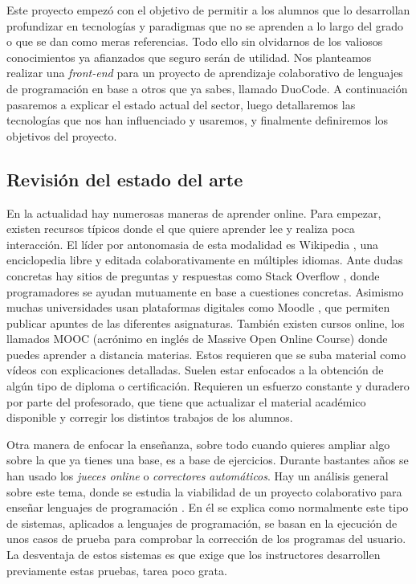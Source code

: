 
Este proyecto empezó con el objetivo de permitir a los alumnos que lo desarrollan profundizar en tecnologías y paradigmas que no se aprenden a lo largo del grado o que se dan como meras referencias. Todo ello sin olvidarnos de los valiosos conocimientos ya afianzados que seguro serán de utilidad. Nos planteamos realizar una \emph{front-end} para un proyecto de aprendizaje colaborativo de lenguajes de programación en base a otros que ya sabes, llamado DuoCode. A continuación pasaremos a explicar el estado actual del sector, luego detallaremos las tecnologías que nos han influenciado y usaremos, y finalmente definiremos los objetivos del proyecto.

\subsection{Revisión del estado del arte\label{subsec:introduction}}

En la actualidad hay numerosas maneras de aprender online. Para empezar, existen recursos típicos donde el que quiere aprender lee y realiza poca interacción. El líder por antonomasia de esta modalidad es Wikipedia \cite{wiki}, una enciclopedia libre y editada colaborativamente en múltiples idiomas. Ante dudas concretas hay sitios de preguntas y respuestas como Stack Overflow \cite{stack}, donde programadores se ayudan mutuamente en base a cuestiones concretas. Asimismo muchas universidades usan plataformas digitales como Moodle \cite{moodle}, que permiten publicar apuntes de las diferentes asignaturas. También existen cursos online, los llamados MOOC (acrónimo en inglés de Massive Open Online Course) donde puedes aprender a distancia materias. Estos requieren  que se suba material como vídeos con explicaciones detalladas. Suelen estar enfocados a la obtención de algún tipo de diploma o certificación. Requieren un esfuerzo constante y duradero por parte del profesorado, que tiene que actualizar el material académico disponible y corregir los distintos trabajos de los alumnos. 
\vspace{1em}

Otra manera de enfocar la enseñanza, sobre todo cuando quieres ampliar algo sobre la que ya tienes una base, es a base de ejercicios. Durante bastantes años se han usado los \emph{jueces online} o \emph{correctores automáticos}. Hay un análisis general sobre este tema, donde se estudia la viabilidad de un proyecto colaborativo para enseñar lenguajes de programación \cite{pimcdDuoCode14}. En él se explica como normalmente este tipo de sistemas, aplicados a lenguajes de programación, se basan en la ejecución de unos casos de prueba para comprobar la corrección de los programas del usuario. La desventaja de estos sistemas es que exige que los instructores desarrollen previamente estas pruebas, tarea poco grata. 
\vspace{1em}

